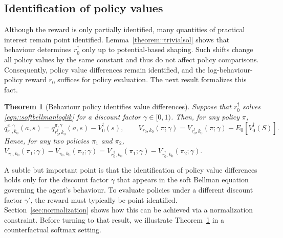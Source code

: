 \documentclass[12pt]{article}
\theoremstyle{plain}
\newtheorem{theorem}{Theorem}
\begin{document}
\subsection{Identification of policy values}
Although the reward is only partially identified, many quantities of practical
interest remain point identified.  Lemma~\ref{theorem::trivialsol} shows that
behaviour determines $r_0^\dagger$ only up to potential-based shaping.  Such
shifts change all policy values by the same constant and thus do not affect
policy comparisons.  Consequently, policy value differences remain identified,
and the log-behaviour-policy reward $r_0$ suffices for policy evaluation.  The
next result formalizes this fact.





\begin{theorem}[Behaviour policy identifies value differences]
\label{theorem::identvalue}
Suppose that \(r_0^\dagger\) solves \eqref{eqn::softbellmanloglik} for a
discount factor \(\gamma \in [0,1)\). Then, for any policy \(\pi\),
\[
q^{\pi,\gamma}_{r_0,k_0}(a,s)
= q^{\pi,\gamma}_{r_0^\dagger,k_0}(a,s) - V_0^\dagger(s),
\qquad
V_{r_0,k_0}(\pi;\gamma)
= V_{r_0^\dagger,k_0}(\pi;\gamma) - E_0[V_0^\dagger(S)].
\]
Hence, for any two policies \(\pi_1\) and \(\pi_2\), $V_{r_0,k_0}(\pi_1;\gamma) - V_{r_0,k_0}(\pi_2;\gamma)
=
V_{r_0^\dagger,k_0}(\pi_1;\gamma)
- 
V_{r_0^\dagger,k_0}(\pi_2;\gamma).$
\end{theorem}

 
\noindent A subtle but important point is that the identification of policy value
differences holds only for the discount factor $\gamma$ that appears in the
soft Bellman equation governing the agent’s behaviour.  To evaluate policies
under a different discount factor $\gamma'$, the reward must typically be
point identified.  Section~\ref{sec:normalization} shows how this can be
achieved via a normalization constraint.  Before turning to that result, we
illustrate Theorem~\ref{theorem::identvalue} in a counterfactual softmax
setting.
\end{document}
